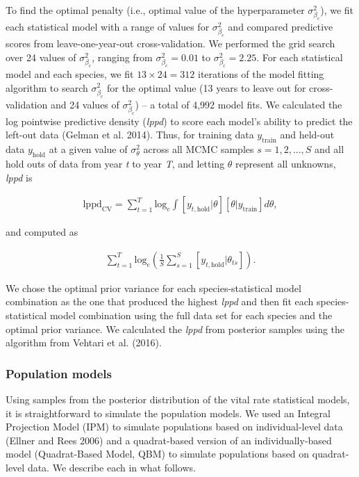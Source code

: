 \documentclass[12pt,]{article}
\begin{document}
To find the optimal penalty (i.e., optimal value of the hyperparameter
\(\sigma_{\beta_c}^2\)), we fit each statistical model with a range of
values for \(\sigma_{\beta_c}^2\) and compared predictive scores from
leave-one-year-out cross-validation. We performed the grid search over
24 values of \(\sigma_{\beta_c}^2\), ranging from
\(\sigma_{\beta_c}^2 = 0.01\) to \(\sigma_{\beta_c}^2 = 2.25\). For each
statistical model and each species, we fit \(13\times24=312\) iterations
of the model fitting algorithm to search \(\sigma_{\beta_c}^2\) for the
optimal value (13 years to leave out for cross-validation and 24 values
of \(\sigma_{\beta_c}^2\)) -- a total of 4,992 model fits. We calculated
the log pointwise predictive density (\emph{lppd}) to score each model's
ability to predict the left-out data (Gelman et al. 2014). Thus, for
training data \(y_{\text{train}}\) and held-out data \(y_{\text{hold}}\)
at a given value of \(\sigma_\theta^2\) across all MCMC samples
\(s=1,2,...,S\) and all hold outs of data from year \emph{t} to year
\emph{T}, and letting \(\theta\) represent all unknowns, \emph{lppd} is

\vspace{-3em}\begin{align}
\text{lppd}_{\text{CV}} = \sum_{t=1}^T \text{log}_e \int [y_{t,\text{hold}}|\theta][\theta|y_{\text{train}}]d\theta,
\end{align}\vspace{-3em}

and computed as

\vspace{-3em}\begin{align}
\sum_{t=1}^T \text{log}_e \left(\frac{1}{S} \sum^S_{s=1}[y_{t,\text{hold}}|\theta_{ts}]  \right).
\end{align}\vspace{-3em}

We chose the optimal prior variance for each species-statistical model
combination as the one that produced the highest \emph{lppd} and then
fit each species-statistical model combination using the full data set
for each species and the optimal prior variance. We calculated the
\emph{lppd} from posterior samples using the algorithm from Vehtari et
al. (2016).

\subsubsection{Population models}\label{population-models}

Using samples from the posterior distribution of the vital rate
statistical models, it is straightforward to simulate the population
models. We used an Integral Projection Model (IPM) to simulate
populations based on individual-level data (Ellner and Rees 2006) and a
quadrat-based version of an individually-based model (Quadrat-Based
Model, QBM) to simulate populations based on quadrat-level data. We
describe each in what follows.
\end{document}
